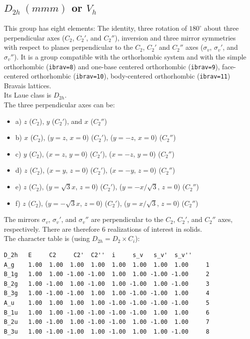 \documentclass[12pt,a4paper]{article}
\begin{document}
\subsection{\color{web-blue}$D_{2h}\ (mmm)$ or $V_h$}  
This group has eight elements: The identity, three rotation of $180^\circ$
about three perpendicular axes ($C_2$, $C_2'$, and $C_2''$),
inversion and three mirror symmetries with respect to planes perpendicular to
the $C_2$, $C_2'$ and $C_2''$ axes ($\sigma_v$, $\sigma_v'$, and $\sigma_v''$).
It is a group compatible with the orthorhombic system and with the
simple orthorhombic (\texttt{ibrav=8}) and one-base centered 
orthorhombic (\texttt{ibrav=9}), face-centered orthorhombic (\texttt{ibrav=10}),
body-centered orthorhombic (\texttt{ibrav=11}) Bravais lattices. \\
Its Laue class is $D_{2h}$. \\
The three perpendicular axes can be:
\begin{itemize}
\item
a) $z$ ($C_2$), $y$ ($C_2'$), and $x$ ($C_2''$)
\item
b) $x$ ($C_2$), ($y=z$, $x=0$) ($C_2'$), ($y=-z$, $x=0$) ($C_2''$)
\item
c) $y$ ($C_2$), ($x=z$, $y=0$) ($C_2'$), ($x=-z$, $y=0$) ($C_2''$)
\item
d) $z$ ($C_2$), ($x=y$, $z=0$) ($C_2'$), ($x=-y$, $z=0$) ($C_2''$)
\item
e) $z$ ($C_2$), ($y=\sqrt{3}x$, $z=0$) ($C_2'$), ($y=-x/\sqrt{3}$, $z=0$) 
($C_2''$)
\item
f) $z$ ($C_2$), ($y=-\sqrt{3}x$, $z=0$) ($C_2'$), ($y=x/\sqrt{3}$, $z=0$) 
($C_2''$)
\end{itemize}
The mirrors $\sigma_v$, $\sigma_v'$, and $\sigma_v''$  are perpendicular to 
the $C_2$, $C_2'$, and $C_2''$ axes, respectively.
There are therefore $6$ realizations of interest in solids. \\
The character table is (using $D_{2h}=D_2 \times C_i$):
\begin{verbatim}
D_2h   E     C2     C2'  C2''  i     s_v   s_v'  s_v''
A_g    1.00  1.00  1.00  1.00  1.00  1.00  1.00  1.00     1 
B_1g   1.00  1.00 -1.00 -1.00  1.00  1.00 -1.00 -1.00     2
B_2g   1.00 -1.00  1.00 -1.00  1.00 -1.00  1.00 -1.00     3
B_3g   1.00 -1.00 -1.00  1.00  1.00 -1.00 -1.00  1.00     4
A_u    1.00  1.00  1.00  1.00 -1.00 -1.00 -1.00 -1.00     5
B_1u   1.00  1.00 -1.00 -1.00 -1.00 -1.00  1.00  1.00     6
B_2u   1.00 -1.00  1.00 -1.00 -1.00  1.00 -1.00  1.00     7
B_3u   1.00 -1.00 -1.00  1.00 -1.00  1.00  1.00 -1.00     8
\end{verbatim}
\end{document}
